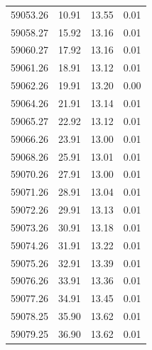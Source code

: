\begin{longtable}{|c|c|c|c|}
 59053.26 &   10.91 &       13.55 &          0.01 \\
 59058.27 &   15.92 &       13.16 &          0.01 \\
 59060.27 &   17.92 &       13.16 &          0.01 \\
 59061.26 &   18.91 &       13.12 &          0.01 \\
 59062.26 &   19.91 &       13.20 &          0.00 \\
 59064.26 &   21.91 &       13.14 &          0.01 \\
 59065.27 &   22.92 &       13.12 &          0.01 \\
 59066.26 &   23.91 &       13.00 &          0.01 \\
 59068.26 &   25.91 &       13.01 &          0.01 \\
 59070.26 &   27.91 &       13.00 &          0.01 \\
 59071.26 &   28.91 &       13.04 &          0.01 \\
 59072.26 &   29.91 &       13.13 &          0.01 \\
 59073.26 &   30.91 &       13.18 &          0.01 \\
 59074.26 &   31.91 &       13.22 &          0.01 \\
 59075.26 &   32.91 &       13.39 &          0.01 \\
 59076.26 &   33.91 &       13.36 &          0.01 \\
 59077.26 &   34.91 &       13.45 &          0.01 \\
 59078.25 &   35.90 &       13.62 &          0.01 \\
 59079.25 &   36.90 &       13.62 &          0.01 \\
\hline
\end{longtable}


